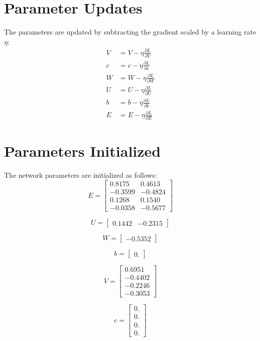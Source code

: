 \documentclass{article}
\begin{document}
\section*{Parameter Updates}

The parameters are updated by subtracting the gradient scaled by a learning rate $\eta$:
\begin{align*}
V &= V - \eta \frac{\partial L}{\partial V}\\
c &= c - \eta \frac{\partial L}{\partial c}\\
W &= W - \eta \frac{\partial L}{\partial W}\\
U &= U - \eta \frac{\partial L}{\partial U}\\
b &= b - \eta \frac{\partial L}{\partial b}\\
E &= E - \eta \frac{\partial L}{\partial E}
\end{align*}

\section{Parameters Initialized}
The network parameters are initialized as follows:
\[
E =
\begin{bmatrix}
  0.8175 & 0.4613 \\
 -0.3599 & -0.4824 \\
  0.1268 & 0.1540 \\
 -0.0358 & -0.5677
\end{bmatrix}
\]

\[
U =
\begin{bmatrix}
  0.1442 & -0.2315
\end{bmatrix}
\]

\[
W =
\begin{bmatrix}
 -0.5352
\end{bmatrix}
\]

\[
b =
\begin{bmatrix}
 0.
\end{bmatrix}
\]

\[
V =
\begin{bmatrix}
  0.6951 \\
 -0.4402 \\
 -0.2246 \\
 -0.3053
\end{bmatrix}
\]

\[
c =
\begin{bmatrix}
 0. \\
 0. \\
 0. \\
 0.
\end{bmatrix}
\]
\newpage
\end{document}
